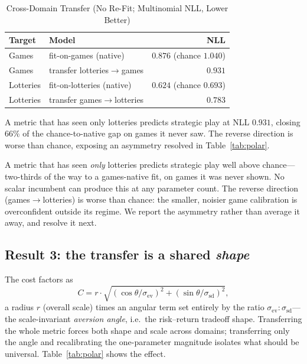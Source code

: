 \documentclass[journal]{IEEEtran}
\begin{document}
\begin{table}[!t]
\renewcommand{\arraystretch}{1.15}
\caption{Cross-Domain Transfer (No Re-Fit; Multinomial NLL, Lower Better)}
\label{tab:transfer}
\centering
\begin{tabular}{l l r}
\toprule
\textbf{Target} & \textbf{Model} & \textbf{NLL} \\
\midrule
Games      & fit-on-games (native)          & $0.876$ \quad (chance $1.040$) \\
Games      & transfer lotteries$\to$games   & $0.931$ \\
Lotteries  & fit-on-lotteries (native)      & $0.624$ \quad (chance $0.693$) \\
Lotteries  & transfer games$\to$lotteries   & $0.783$ \\
\bottomrule
\end{tabular}
\begin{flushleft}
\footnotesize{A metric that has seen only lotteries predicts strategic play at NLL $0.931$, closing $66\%$ of the chance-to-native gap on games it never saw. The reverse direction is worse than chance, exposing an asymmetry resolved in Table~\ref{tab:polar}.}
\end{flushleft}
\end{table}

A metric that has seen \emph{only} lotteries predicts strategic play well above chance---two-thirds of the way to a games-native fit, on games it was never shown.
No scalar incumbent can produce this at any parameter count.
The reverse direction (games$\to$lotteries) is worse than chance: the smaller, noisier game calibration is overconfident outside its regime.
We report the asymmetry rather than average it away, and resolve it next.

\subsection{Result 3: the transfer is a shared \emph{shape}}
The cost factors as
\begin{equation}
    C = r\cdot\sqrt{(\cos\theta/\sigma_{\mathrm{ev}})^2 + (\sin\theta/\sigma_{\mathrm{sd}})^2},
    \label{eq:polar}
\end{equation}
a radius $r$ (overall scale) times an angular term set entirely by the ratio $\sigma_{\mathrm{ev}}\!:\!\sigma_{\mathrm{sd}}$---the scale-invariant \emph{aversion angle}, i.e.\ the risk--return tradeoff shape.
Transferring the whole metric forces both shape and scale across domains; transferring only the angle and recalibrating the one-parameter magnitude isolates what should be universal.
Table~\ref{tab:polar} shows the effect.
\end{document}
